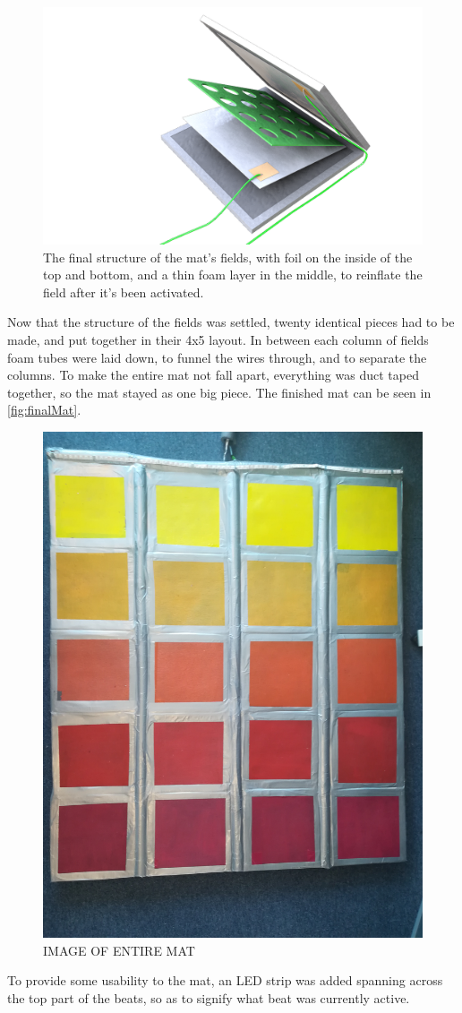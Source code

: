 	\begin{figure}[H]
		\centering
		\includegraphics[width=1\linewidth]{figure/Implementation/Medialogyp4mat}
		\caption{The final structure of the mat's fields, with foil on the inside of the top and bottom, and a thin foam layer in the middle, to reinflate the field after it's been activated.}
		\label{fig:finalField}
	\end{figure}
	Now that the structure of the fields was settled, twenty identical pieces had to be made, and put together in their 4x5 layout. In between each column of fields foam tubes were laid down, to funnel the wires through, and to separate the columns. To make the entire mat not fall apart, everything was duct taped together, so the mat stayed as one big piece. The finished mat can be seen in \autoref{fig:finalMat}.
	\begin{figure}[H]
		\centering
		\includegraphics[width=0.6\linewidth]{figure/Implementation/fullMat}
		\caption{IMAGE OF ENTIRE MAT}
		\label{fig:finalMat}
	\end{figure}
 	To provide some usability to the mat, an LED strip was added spanning across the top part of the beats, so as to signify what beat was currently active.
	
